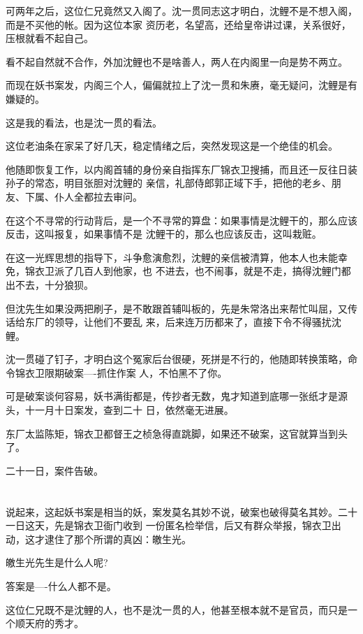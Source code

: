 \documentclass[11pt,a4paper,onecolumn]{article}
\begin{document}
可两年之后，这位仁兄竟然又入阁了。沈一贯同志这才明白，沈鲤不是不想入阁，而是不买他的帐。因为这位本家
资历老，名望高，还给皇帝讲过课，关系很好，压根就看不起自己。

看不起自然就不合作，外加沈鲤也不是啥善人，两人在内阁里一向是势不两立。

而现在妖书案发，内阁三个人，偏偏就拉上了沈一贯和朱赓，毫无疑问，沈鲤是有嫌疑的。

这是我的看法，也是沈一贯的看法。

这位老油条在家呆了好几天，稳定情绪之后，突然发现这是一个绝佳的机会。

他随即恢复工作，以内阁首辅的身份亲自指挥东厂锦衣卫搜捕，而且还一反往日装孙子的常态，明目张胆对沈鲤的
亲信，礼部侍郎郭正域下手，把他的老乡、朋友、下属、仆人全都拉去审问。

在这个不寻常的行动背后，是一个不寻常的算盘：如果事情是沈鲤干的，那么应该反击，这叫报复，如果事情不是
沈鲤干的，那么也应该反击，这叫栽赃。

在这一光辉思想的指导下，斗争愈演愈烈，沈鲤的亲信被清算，他本人也未能幸免，锦衣卫派了几百人到他家，也
不进去，也不闹事，就是不走，搞得沈鲤门都出不去，十分狼狈。

但沈先生如果没两把刷子，是不敢跟首辅叫板的，先是朱常洛出来帮忙叫屈，又传话给东厂的领导，让他们不要乱
来，后来连万历都来了，直接下令不得骚扰沈鲤。

沈一贯碰了钉子，才明白这个冤家后台很硬，死拼是不行的，他随即转换策略，命令锦衣卫限期破案----抓住作案
人，不怕黑不了你。

可是破案谈何容易，妖书满街都是，传抄者无数，鬼才知道到底哪一张纸才是源头，十一月十日案发，查到二十
日，依然毫无进展。

东厂太监陈矩，锦衣卫都督王之桢急得直跳脚，如果还不破案，这官就算当到头了。

二十一日，案件告破。

\section[\thesection]{}

说起来，这起妖书案是相当的妖，案发莫名其妙不说，破案也破得莫名其妙。二十一日这天，先是锦衣卫衙门收到
一份匿名检举信，后又有群众举报，锦衣卫出动，这才逮住了那个所谓的真凶：皦生光。

皦生光先生是什么人呢?

答案是----什么人都不是。

这位仁兄既不是沈鲤的人，也不是沈一贯的人，他甚至根本就不是官员，而只是一个顺天府的秀才。
\end{document}
